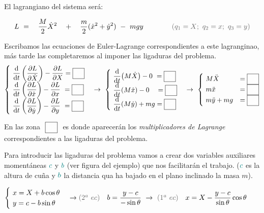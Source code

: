 El lagrangiano del sistema será:

\begin{equation}
L \ = \ \ \ \dfrac M 2 \dot X^2 \ \ \ + \ \ \  \dfrac m 2 (\dot x^2 + \dot y^2) \ - \  mgy  \qquad \qquad \textcolor{gris}{(q_1=X;\ q_2=x; \ q_3=y)}
\end{equation}

Escribamos las ecuaciones de Euler-Lagrange correspondientes a este lagranginao, más tarde las completaremos al imponer las ligaduras del problema.
\begin{equation}
\label{T10EELsinL}
\displaystyle
\begin{cases} 
\ \displaystyle \dv{t} \left(\pdv{L}{\dot X}\right) - \pdv{L}{X} = \framebox{\textcolor{white}{lig}} \\ 
\ \displaystyle \dv{t} \left(\pdv{L}{\dot x}\right) - \pdv{L}{x} \ = \framebox{\textcolor{white}{lig}} \\ 
\ \displaystyle \dv{t} \left(\pdv{L}{\dot y}\right) - \pdv{L}{y} \ = \framebox{\textcolor{white}{lig}}
\end{cases}
\to \
\begin{cases}
\ \displaystyle \dv{t}(M\dot X)-0 \ =	\framebox{\textcolor{white}{lig}} \\
\ \displaystyle \dv{t}(M\dot x)-0 \ \ \ =	\framebox{\textcolor{white}{lig}} \\
\ \displaystyle \dv{t}(M\dot y)+mg=	\framebox{\textcolor{white}{lig}} 
\end{cases}
\to \
\begin{cases}
\ M \ddot X &= \framebox{\textcolor{white}{lig}} \\
\ m \ddot x	 &= \framebox{\textcolor{white}{lig}} \\
\ m\ddot y + mg &= \framebox{\textcolor{white}{lig}}
\end{cases}
\end{equation}

En las zona $\ \framebox{\textcolor{white}{lig}} \ $ es donde aparecerán los \emph{multiplicadores de Lagrange} correspondientes a las ligaduras del problema.

Para introducir las ligaduras del problema vamos a crear dos variables auxiliares momentáneas $\textcolor{teal}{c}$ y $\textcolor{teal}{b}$ (ver figura del ejemplo) que nos facilitarán el trabajo. ($\textcolor{teal}{c}$ es la altura de cuña y $\textcolor{teal}{b}$ la distancia qua ha bajado en el plano inclinado la masa $m$).


$\begin{cases}
\ x=X+b\cos \theta \\ \ y=c-b\sin \theta	
\end{cases} \to \textcolor{gris}{(2^a \ ec)} \ \ \ b=\dfrac {y-c}{-\sin \theta} \ \to \ \textcolor{gris}{(1^a \ ec)} \ \ \ x=X-\dfrac{y-c}{\sin \theta} \cos \theta$

